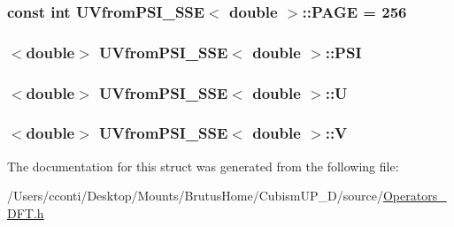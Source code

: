 \subsubsection[{P\+A\+G\+E}]{\setlength{\rightskip}{0pt plus 5cm}const int {\bf U\+Vfrom\+P\+S\+I\+\_\+\+S\+S\+E}$<$ double $>$\+::P\+A\+G\+E = 256\hspace{0.3cm}{\ttfamily [static]}}\label{struct_u_vfrom_p_s_i___s_s_e_3_01double_01_4_ab216503dd8df3019354f56281bb0dccb}
\hypertarget{struct_u_vfrom_p_s_i___s_s_e_3_01double_01_4_a85a52a48e0761ffe50e94a48ec6c652e}{}
\subsubsection[{P\+S\+I}]{$<$double$>$ {\bf U\+Vfrom\+P\+S\+I\+\_\+\+S\+S\+E}$<$ double $>$\+::P\+S\+I}\label{struct_u_vfrom_p_s_i___s_s_e_3_01double_01_4_a85a52a48e0761ffe50e94a48ec6c652e}
\hypertarget{struct_u_vfrom_p_s_i___s_s_e_3_01double_01_4_a4dc3dc281fa328c5b353e97610b762d8}{}
\subsubsection[{U}]{$<$double$>$ {\bf U\+Vfrom\+P\+S\+I\+\_\+\+S\+S\+E}$<$ double $>$\+::U}\label{struct_u_vfrom_p_s_i___s_s_e_3_01double_01_4_a4dc3dc281fa328c5b353e97610b762d8}
\hypertarget{struct_u_vfrom_p_s_i___s_s_e_3_01double_01_4_a7e5177ab59f35582a6782b43106ec3d8}{}
\subsubsection[{V}]{$<$double$>$ {\bf U\+Vfrom\+P\+S\+I\+\_\+\+S\+S\+E}$<$ double $>$\+::V}\label{struct_u_vfrom_p_s_i___s_s_e_3_01double_01_4_a7e5177ab59f35582a6782b43106ec3d8}


The documentation for this struct was generated from the following file\+:\begin{DoxyCompactItemize}
\item 
/\+Users/cconti/\+Desktop/\+Mounts/\+Brutus\+Home/\+Cubism\+U\+P\+\_\+D/source/\hyperlink{_operators___d_f_t_8h}{Operators\+\_\+\+D\+F\+T.\+h}\end{DoxyCompactItemize}
